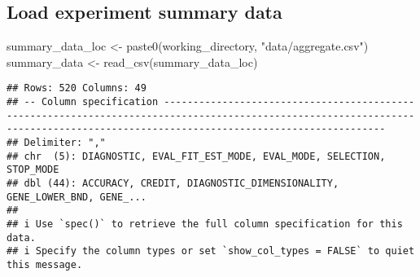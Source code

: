 \documentclass[
]{book}
\newenvironment{Shaded}{\begin{snugshade}}{\end{snugshade}}
\newcommand{\FunctionTok}[1]{\textcolor[rgb]{0.00,0.00,0.00}{#1}}
\newcommand{\NormalTok}[1]{#1}
\newcommand{\OtherTok}[1]{\textcolor[rgb]{0.56,0.35,0.01}{#1}}
\newcommand{\StringTok}[1]{\textcolor[rgb]{0.31,0.60,0.02}{#1}}
\begin{document}
\hypertarget{load-experiment-summary-data}{%
\subsection{Load experiment summary data}\label{load-experiment-summary-data}}

\begin{Shaded}
\begin{Highlighting}[]
\NormalTok{summary\_data\_loc }\OtherTok{\textless{}{-}} \FunctionTok{paste0}\NormalTok{(working\_directory, }\StringTok{"data/aggregate.csv"}\NormalTok{)}
\NormalTok{summary\_data }\OtherTok{\textless{}{-}} \FunctionTok{read\_csv}\NormalTok{(summary\_data\_loc)}
\end{Highlighting}
\end{Shaded}

\begin{verbatim}
## Rows: 520 Columns: 49
## -- Column specification ----------------------------------------------------------------------------------------------------------------------------------------------------------------------------------
## Delimiter: ","
## chr  (5): DIAGNOSTIC, EVAL_FIT_EST_MODE, EVAL_MODE, SELECTION, STOP_MODE
## dbl (44): ACCURACY, CREDIT, DIAGNOSTIC_DIMENSIONALITY, GENE_LOWER_BND, GENE_...
## 
## i Use `spec()` to retrieve the full column specification for this data.
## i Specify the column types or set `show_col_types = FALSE` to quiet this message.
\end{verbatim}
\end{document}
